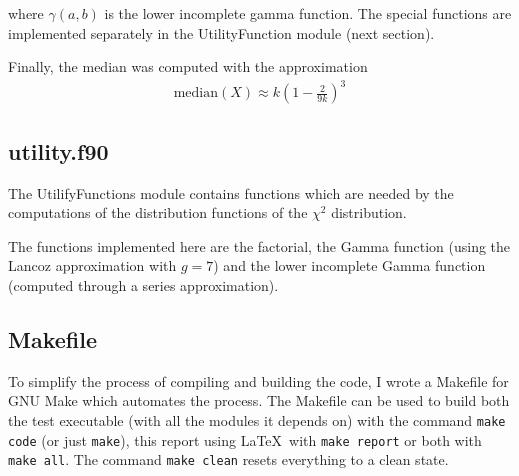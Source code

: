 \documentclass[a4paper]{article}
\begin{document}
where $\gamma(a,b)$ is the lower incomplete gamma function. The special functions are implemented separately in the UtilityFunction module (next section).

Finally, the median was computed with the approximation
\begin{align}
 \text{median}(X) \approx k(1 - \frac{2}{9k})^3
\end{align}

\subsection{utility.f90}

The UtilifyFunctions module contains functions which are needed by the computations of the distribution functions of the $\chi^2$ distribution.

The functions implemented here are the factorial, the Gamma function (using the Lancoz approximation with $g=7$) and the lower incomplete Gamma function (computed through a series approximation).

\subsection{Makefile}

To simplify the process of compiling and building the code, I wrote a Makefile for GNU Make which automates the process. The Makefile can be used to build both the test executable (with all the modules it depends on) with the command \verb+make code+ (or just \verb+make+), this report using \LaTeX~with \verb+make report+ or both with \verb+make all+. The command \verb+make clean+ resets everything to a clean state.
\end{document}
